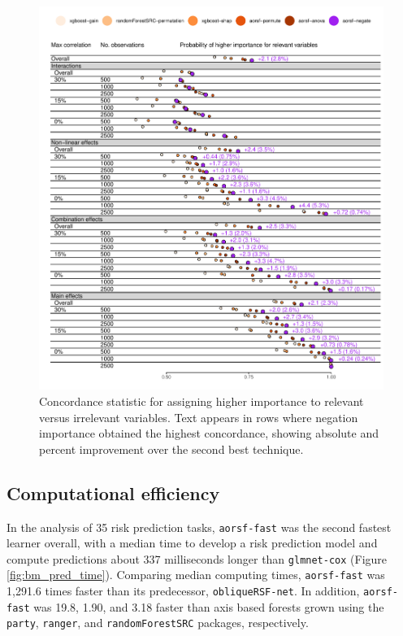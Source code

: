 \documentclass[12pt]{article}\usepackage[]{graphicx}\usepackage[]{xcolor}
\makeatletter
\def\maxwidth{ %
  \ifdim\Gin@nat@width>\linewidth
    \linewidth
  \else
    \Gin@nat@width
  \fi
}
\newenvironment{knitrout}{}{} %
\makeatother
\begin{document}
\begin{knitrout}
\color{fgcolor}\begin{figure}
\includegraphics[width=\maxwidth]{figure/bm_vi_viz-1} \caption[Concordance statistic for assigning higher importance to relevant versus irrelevant variables]{Concordance statistic for assigning higher importance to relevant versus irrelevant variables. Text appears in rows where negation importance obtained the highest concordance, showing absolute and percent improvement over the second best technique.}\label{fig:bm_vi_viz}
\end{figure}

\end{knitrout}

\subsection{Computational efficiency} \label{sec:results_computing}




In the analysis of 35 risk prediction tasks, \texttt{aorsf-fast} was the second fastest learner overall, with a median time to develop a risk prediction model and compute predictions about 337 milliseconds longer than \texttt{glmnet-cox} (Figure \ref{fig:bm_pred_time}). Comparing median computing times, \texttt{aorsf-fast} was 1,291.6 times faster than its predecessor, \texttt{obliqueRSF-net}. In addition, \texttt{aorsf-fast} was 19.8, 1.90, and 3.18 faster than axis based forests grown using the \texttt{party}, \texttt{ranger}, and \texttt{randomForestSRC} packages, respectively.
\end{document}
